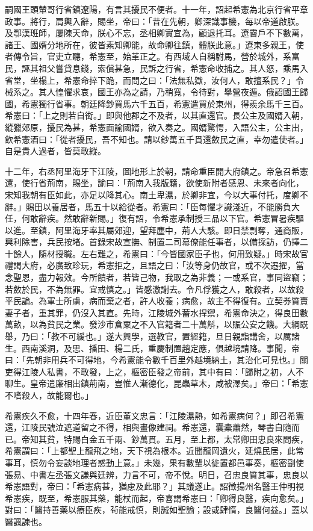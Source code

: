 \begin{pinyinscope}
 嗣國王頭輦哥行省鎮遼陽，有言其擾民不便者。十一年，詔起希憲為北京行省平章政事。將行，肩輿入辭，賜坐，帝曰：「昔在先朝，卿深識事機，每以帝道啟朕。及鄂漢班師，屢陳天命，朕心不忘，丞相卿實宜為，顧退托耳。遼霫戶不下數萬，諸王、國婿分地所在，彼皆素知卿能，故命卿往鎮，體朕此意。」遼東多親王，使者傳令旨，官吏立聽，希憲至，始革正之。有西域人自稱駙馬，營於城外，系富民，誣其祖父嘗貸息錢，索償甚急，民訴之行省，希憲命收捕之。其人怒，乘馬入省堂，坐榻上，希憲命捽下跪，而問之曰：「法無私獄，汝何人，敢擅系民？」令械系之。其人惶懼求哀，國王亦為之請，乃稍寬，令待對，舉營夜遁。俄詔國王歸國，希憲獨行省事。朝廷降鈔買馬六千五百，希憲遣買於東州，得羨余馬千三百。希憲曰：「上之則若自衒。」即與他郡之不及者，以其直還官。長公主及國婿入朝，縱獵郊原，擾民為甚，希憲面諭國婿，欲入奏之。國婿驚愕，入語公主，公主出，飲希憲酒曰：「從者擾民，吾不知也。請以鈔萬五千貫還斂民之直，幸勿遣使者。」自是貴人過者，皆莫敢縱。



 十二年，右丞阿里海牙下江陵，圖地形上於朝，請命重臣開大府鎮之。帝急召希憲還，使行省荊南，賜坐，諭曰：「荊南入我版籍，欲使新附者感恩、未來者向化，宋知我朝有臣如此，亦足以降其心。南土卑濕，於卿非宜，今以大事付托，度卿不辭。」賜田以養居者，馬五十以給從者。希憲曰：「臣每懼才識淺近，不能勝負大任，何敢辭疾。然敢辭新賜。」復有詔，令希憲承制授三品以下官。希憲冒暑疾驅以進。至鎮，阿里海牙率其屬郊迎，望拜塵中，荊人大駭。即日禁剽奪，通商販，興利除害，兵民按堵。首錄宋故宣撫、制置二司幕僚能任事者，以備採訪，仍擇二十餘人，隨材授職。左右難之，希憲曰：「今皆國家臣子也，何用致疑。」時宋故官禮謁大府，必廣致珍玩，希憲拒之，且語之曰：「汝等身仍故官，或不次遷擢，當念聖恩，盡力報效。今所饋者，若皆己物，我取之為非義；一或系官，事同盜竊；若斂於民，不為無罪。宜戒慎之。」皆感激謝去。令凡俘獲之人，敢殺者，以故殺平民論。為軍士所虜，病而棄之者，許人收養；病愈，故主不得復有。立契券質賣妻子者，重其罪，仍沒入其直。先時，江陵城外蓄水捍禦，希憲命決之，得良田數萬畝，以為貧民之業。發沙市倉粟之不入官籍者二十萬斛，以賑公安之饑。大綱既舉，乃曰：「教不可緩也。」遂大興學，選教官，置經籍，旦日親詣講舍，以厲諸生。西南溪洞，及思、播田、楊二氏，重慶制置趙定應，俱越境請降。事聞，帝曰：「先朝非用兵不可得地，今希憲能令數千百里外越境納土，其治化可見也。」關吏得江陵人私書，不敢發，上之，樞密臣發之帝前，其中有曰：「歸附之初，人不聊生。皇帝遣廉相出鎮荊南，豈惟人漸德化，昆蟲草木，咸被澤矣。」帝曰：「希憲不嗜殺人，故能爾也。」



 希憲疾久不愈，十四年春，近臣董文忠言：「江陵濕熱，如希憲病何？」即召希憲還，江陵民號泣遮道留之不得，相與畫像建祠。希憲還，囊橐蕭然，琴書自隨而已。帝知其貧，特賜白金五千兩、鈔萬貫。五月，至上都，太常卿田忠良來問疾，希憲謂曰：「上都聖上龍飛之地，天下視為根本。近聞龍岡遺火，延燒民居，此常事耳，慎勿令妄談地理者惑動上意。」未幾，果有數輩以徙置都邑事奏，樞密副使張易、中書左丞張文謙與廷辨，力言不可，帝不悅。明日，召忠良質其事，忠良以希憲語對，帝曰：「希憲病甚，猶慮及此耶？」其議遂止。詔徵揚州名醫王仲明視希憲疾，既至，希憲服其藥，能杖而起，帝喜謂希憲曰：「卿得良醫，疾向愈矣。」對曰：「醫持善藥以療臣疾，茍能戒慎，則誠如聖諭；設或肆惰，良醫何益。」蓋以醫諷諫也。




\end{pinyinscope}
